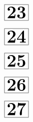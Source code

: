 \documentclass[a4paper, 10pt]{article}
\begin{document}
\thispagestyle{empty}
\begin{minipage}[t]{0.17\textwidth}
                \vspace*{-1.59cm}
        \hspace*{2.4cm}
        $\boxed{\textbf{\Huge23}}$
\end{minipage}
\begin{minipage}[t]{0.83\textwidth}
        
\end{minipage}

\thispagestyle{empty}
\begin{minipage}[t]{0.17\textwidth}
                \vspace*{-1.59cm}
        \hspace*{2.4cm}
        $\boxed{\textbf{\Huge24}}$
\end{minipage}
\begin{minipage}[t]{0.83\textwidth}
        
\end{minipage}

\thispagestyle{empty}
\begin{minipage}[t]{0.17\textwidth}
                \vspace*{-1.59cm}
        \hspace*{2.4cm}
        $\boxed{\textbf{\Huge25}}$
\end{minipage}
\begin{minipage}[t]{0.83\textwidth}
        
\end{minipage}

\thispagestyle{empty}
\begin{minipage}[t]{0.17\textwidth}
                \vspace*{-1.59cm}
        \hspace*{2.4cm}
        $\boxed{\textbf{\Huge26}}$
\end{minipage}
\begin{minipage}[t]{0.83\textwidth}
        
\end{minipage}

\thispagestyle{empty}
\begin{minipage}[t]{0.17\textwidth}
                \vspace*{-1.59cm}
        \hspace*{2.4cm}
        $\boxed{\textbf{\Huge27}}$
\end{minipage}
\begin{minipage}[t]{0.83\textwidth}
        
\end{minipage}
\end{document}
